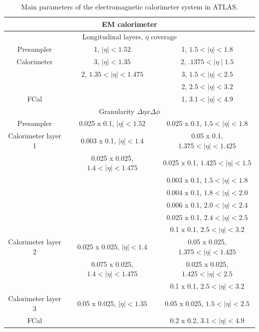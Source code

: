 \begin{table}
  \centering
  \begin{tabular}{ |c|c|c|}
  \hline
  \multicolumn{3}{|c|}{\textbf{EM calorimeter}} \\
  \hline
  \hline
  \multicolumn{3}{|c|}{Longitudinal layers, $\eta$ coverage} \\
  \hline
  Presampler  & 1, $\mid\eta\mid<1.52$            & 1, $1.5<\mid\eta\mid<1.8$ \\
  \hline
  Calorimeter & 3, $\mid\eta\mid<1.35$            & 2, $.1375<\mid\eta\mid1.5$ \\
              & 2, $1.35<\mid\eta\mid<1.475$      & 3, $1.5<\mid\eta\mid<2.5$ \\
              &                                   & 2, $2.5<\mid\eta\mid<3.2$ \\
  \hline
  FCal        &                                   & 1, $3.1<\mid\eta\mid < 4.9$ \\
  \hline
  \multicolumn{3}{|c|}{Granularity $\Delta\eta x \Delta\phi$} \\
  \hline
  Presampler  & 0.025 x 0.1, $\mid\eta\mid<1.52$                & 0.025 x 0.1, $1.5<\mid\eta\mid<1.8$ \\
  \hline
  Calorimeter layer 1 & 0.003 x 0.1, $\mid\eta\mid<1.4$         & 0.05 x 0.1,  $1.375<\mid\eta\mid<1.425$ \\
                      & 0.025 x 0.025, $1.4<\mid\eta\mid<1.475$ & 0.025 x 0.1, $1.425<\mid\eta\mid<1.5$ \\
                      &                                         & 0.003 x 0.1, $1.5<\mid\eta\mid<1.8$ \\
                      &                                         & 0.004 x 0.1, $1.8<\mid\eta\mid<2.0$ \\
                      &                                         & 0.006 x 0.1, $2.0<\mid\eta\mid<2.4$ \\
                      &                                         & 0.025 x 0.1, $2.4<\mid\eta\mid<2.5$ \\
                      &                                         & 0.1 x 0.1,   $2.5<\mid\eta\mid<3.2$ \\
  \hline
  Calorimeter layer 2 & 0.025 x 0.025, $\mid\eta\mid<1.4$       & 0.05 x 0.025,$1.375<\mid\eta\mid<1.425$ \\
                      & 0.075 x 0.025, $1.4<\mid\eta\mid<1.475$ & 0.025 x 0.025, $1.425<\mid\eta\mid<2.5$ \\
                      &                                         & 0.1 x 0.1, $2.5<\mid\eta\mid<3.2$ \\
  \hline
  Calorimeter layer 3 & 0.05 x 0.025, $\mid\eta\mid<1.35$       & 0.05 x 0.025, $1.5<\mid\eta\mid<2.5$ \\
  \hline
  FCal                &                                         & 0.2 x 0.2, $3.1<\mid\eta\mid < 4.9$ \\
  \hline
  \end{tabular}
  \caption[Main parameters of the electromagnetic calorimeter system. ]
        {\small Main parameters of the electromagnetic calorimeter system in ATLAS.\cite{JOIATLAS} }
\label{table:EMCalo}
\end{table}
